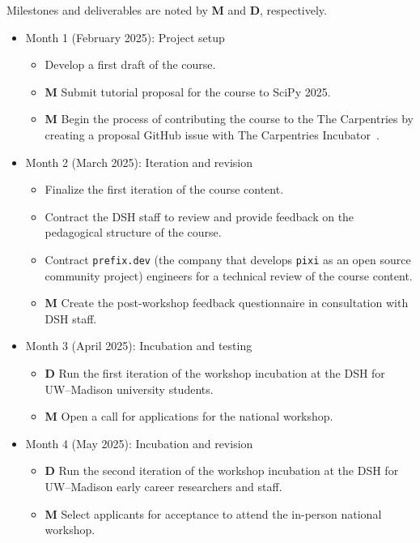 \documentclass[letterpaper, 11pt]{article}
\newcommand{\institute}{UW--Madison}
\newcommand{\milestone}{\textbf{\textrm{M}}}
\newcommand{\deliverable}{\textbf{\textrm{D}}}
\begin{document}
Milestones and deliverables are noted by \milestone{} and \deliverable{}, respectively.

\begin{itemize}
  \item Month 1 (February 2025): Project setup
    \begin{itemize}
      \item Develop a first draft of the course.
      \item \milestone{} Submit tutorial proposal for the course to SciPy 2025.
      \item \milestone{} Begin the process of contributing the course to the The Carpentries by creating a proposal GitHub issue with The Carpentries Incubator~\cite{carpentries_incubator_proposals}.
    \end{itemize}
  \item Month 2 (March 2025): Iteration and revision
    \begin{itemize}
      \item Finalize the first iteration of the course content.
      \item Contract the DSH staff to review and provide feedback on the pedagogical structure of the course.
      \item Contract \texttt{prefix.dev} (the company that develops \texttt{pixi} as an open source community project) engineers for a technical review of the course content.
      \item \milestone{} Create the post-workshop feedback questionnaire in consultation with DSH staff.
    \end{itemize}
  \item Month 3 (April 2025): Incubation and testing
    \begin{itemize}
      \item \deliverable{} Run the first iteration of the workshop incubation at the DSH for \institute{} university students.
      \item \milestone{} Open a call for applications for the national workshop.
    \end{itemize}
  \item Month 4 (May 2025): Incubation and revision
    \begin{itemize}
      \item \deliverable{} Run the second iteration of the workshop incubation at the DSH for \institute{} early career researchers and staff.
      \item \milestone{} Select applicants for acceptance to attend the in-person national workshop.

\end{itemize}
\end{itemize}
\end{document}
